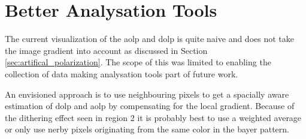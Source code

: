 \section{Better Analysation Tools}
\label{sec:better_analysation_tools}
The current visualization of the \gls{aolp} and \gls{dolp} is quite naive and does not take the image gradient into account as discussed in Section \ref{sec:artifical_polarization}.
The scope of this \master was limited to enabling the collection of data making analysation tools part of future work.

An envisioned approach is to use neighbouring pixels to get a spacially aware estimation of \gls{dolp} and \gls{aolp} by compensating for the local gradient.
Because of the dithering effect seen in region 2 it is probably best to use a weighted average or only use nerby pixels originating from the same color in the bayer pattern.